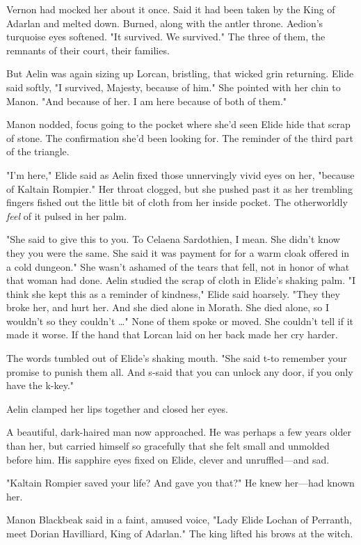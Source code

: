 Vernon had mocked her about it once. Said it had been taken by the King of Adarlan and melted down. Burned, along with the antler throne. Aedion's turquoise eyes softened. "It survived. We survived." The three of them, the remnants of their court, their families.

But Aelin was again sizing up Lorcan, bristling, that wicked grin returning. Elide said softly, "I survived, Majesty, because of him." She pointed with her chin to Manon. "And because of her. I am here because of both of them."

Manon nodded, focus going to the pocket where she'd seen Elide hide that scrap of stone. The confirmation she'd been looking for. The reminder of the third part of the triangle.

"I'm here," Elide said as Aelin fixed those unnervingly vivid eyes on her, "because of Kaltain Rompier." Her throat clogged, but she pushed past it as her trembling fingers fished out the little bit of cloth from her inside pocket. The otherworldly \emph{feel} of it pulsed in her palm.

"She said to give this to you. To Celaena Sardothien, I mean. She didn't know they  you were the same. She said it was payment for
 for a warm cloak offered in a cold dungeon." She wasn't ashamed of the tears that fell, not in honor of what that woman had done. Aelin studied the scrap of cloth in Elide's shaking palm. "I think she kept this as a reminder of kindness," Elide said hoarsely. "They  they broke her, and hurt her. And she died alone in Morath. She died alone, so I wouldn't  so they couldn't \ldots" None of them spoke or moved. She couldn't tell if it made it worse. If the hand that Lorcan laid on her back made her cry harder.

The words tumbled out of Elide's shaking mouth. "She said t-to remember your promise to punish them all. And s-said that you can unlock any door, if you only have the k-key."

Aelin clamped her lips together and closed her eyes.

A beautiful, dark-haired man now approached. He was perhaps a few years older than her, but carried himself so gracefully that she felt small and unmolded before him. His sapphire eyes fixed on Elide, clever and unruffled---and sad.

"Kaltain Rompier saved your life? And gave you that?" He knew her---had known her.

Manon Blackbeak said in a faint, amused voice, "Lady Elide Lochan of Perranth, meet Dorian Havilliard, King of Adarlan." The king lifted his brows at the witch.

